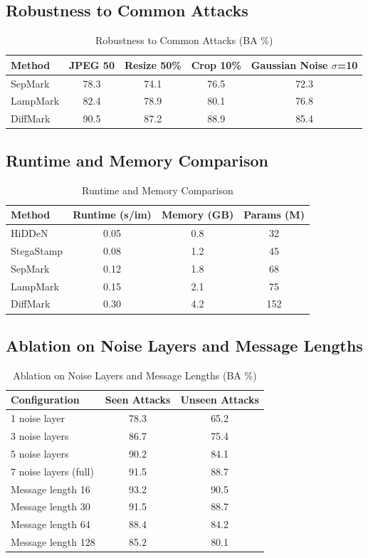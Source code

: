 \documentclass{article}
\begin{document}
\subsection{Robustness to Common Attacks}
\begin{table}[h]
\centering
\caption{Robustness to Common Attacks (BA \%)}
\begin{tabular}{lcccc}
\toprule
Method & JPEG 50 & Resize 50\% & Crop 10\% & Gaussian Noise $\sigma$=10 \\
\midrule
SepMark & 78.3 & 74.1 & 76.5 & 72.3 \\
LampMark & 82.4 & 78.9 & 80.1 & 76.8 \\
DiffMark & 90.5 & 87.2 & 88.9 & 85.4 \\
\bottomrule
\end{tabular}
\end{table}

\subsection{Runtime and Memory Comparison}
\begin{table}[h]
\centering
\caption{Runtime and Memory Comparison}
\begin{tabular}{lccc}
\toprule
Method & Runtime (s/im) & Memory (GB) & Params (M) \\
\midrule
HiDDeN & 0.05 & 0.8 & 32 \\
StegaStamp & 0.08 & 1.2 & 45 \\
SepMark & 0.12 & 1.8 & 68 \\
LampMark & 0.15 & 2.1 & 75 \\
DiffMark & 0.30 & 4.2 & 152 \\
\bottomrule
\end{tabular}
\end{table}

\subsection{Ablation on Noise Layers and Message Lengths}
\begin{table}[h]
\centering
\caption{Ablation on Noise Layers and Message Lengths (BA \%)}
\begin{tabular}{lcc}
\toprule
Configuration & Seen Attacks & Unseen Attacks \\
\midrule
1 noise layer & 78.3 & 65.2 \\
3 noise layers & 86.7 & 75.4 \\
5 noise layers & 90.2 & 84.1 \\
7 noise layers (full) & 91.5 & 88.7 \\
\midrule
Message length 16 & 93.2 & 90.5 \\
Message length 30 & 91.5 & 88.7 \\
Message length 64 & 88.4 & 84.2 \\
Message length 128 & 85.2 & 80.1 \\
\bottomrule
\end{tabular}
\end{table}
\end{document}
